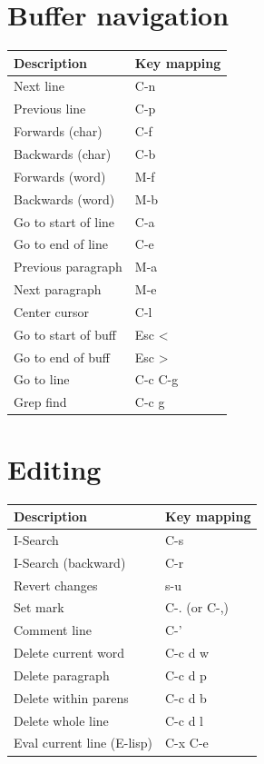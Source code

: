 \documentclass[11pt]{article}
\author{Simon Danielsson}
\date{\today}
\title{}
\begin{document}
\tableofcontents

\section{Buffer navigation}
\label{sec:orgd4720ae}

\begin{center}
\begin{tabular}{ll}
Description & Key mapping\\
\hline
Next line & C-n\\
Previous line & C-p\\
Forwards (char) & C-f\\
Backwards (char) & C-b\\
Forwards (word) & M-f\\
Backwards (word) & M-b\\
Go to start of line & C-a\\
Go to end of line & C-e\\
Previous paragraph & M-a\\
Next paragraph & M-e\\
Center cursor & C-l\\
Go to start of buff & Esc <\\
Go to end of buff & Esc >\\
Go to line & C-c C-g\\
Grep find & C-c g\\
\end{tabular}
\end{center}
\section{Editing}
\label{sec:org1dd279b}

\begin{center}
\begin{tabular}{ll}
Description & Key mapping\\
\hline
I-Search & C-s\\
I-Search (backward) & C-r\\
Revert changes & s-u\\
Set mark & C-. (or C-,)\\
Comment line & C-'\\
Delete current word & C-c d w\\
Delete paragraph & C-c d p\\
Delete within parens & C-c d b\\
Delete whole line & C-c d l\\
Eval current line (E-lisp) & C-x C-e\\
\end{tabular}
\end{center}
\end{document}
